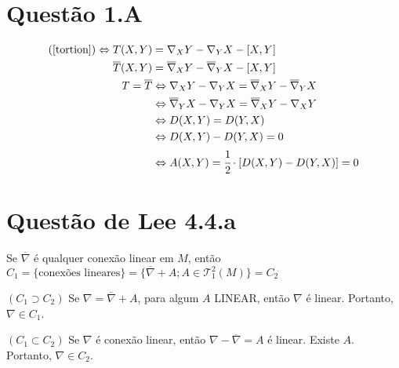\documentclass[10pt,a4paper]{article}
\begin{document}
		\vspace{12mm}

	\section{Quest\~ao 1.A}
		\begin{flushright}
		\end{flushright}

		\begin{align*}
		(\ref{tortion}) \Leftrightarrow T(X, Y) &= \nabla_X Y - \nabla_Y X - [X, Y] \\
		\overline{T}(X, Y) &= \overline{\nabla}_X Y - \overline{\nabla}_Y X - [X, Y] \\
		T = \overline{T} &\Leftrightarrow \nabla_X Y - \nabla_Y X = \overline{\nabla}_X Y - \overline{\nabla}_Y X \\
		 &\Leftrightarrow \overline{\nabla}_Y X - \nabla_Y X = \overline{\nabla}_X Y - \nabla_X Y \\
		 &\Leftrightarrow D(X, Y) = D(Y, X) \\
		 &\Leftrightarrow D(X, Y) - D(Y, X) = 0 \\
		 &\Leftrightarrow A(X, Y) = \cfrac{1}{2} \cdot [D(X, Y) - D(Y, X)] = 0 \\
		\end{align*}

		\vspace{12mm}

	\section{Quest\~ao de Lee 4.4.a}
		\begin{flushright}
		\end{flushright}

		Se $\overline{\nabla}$ \'e qualquer conex\~ao linear em $M$, ent\~ao $C_1 = \{ \text{conex\~oes lineares} \} = \{ \overline{\nabla} + A ; A \in \mathcal{T}^2_1(M)  \} = C_2$

		\vspace{12mm}

		$(C_1 \supset C_2)$ Se $\nabla = \overline{\nabla} + A$, para algum $A$ LINEAR, ent\~ao $\nabla$ \'e linear. Portanto, $\nabla \in C_1$.

		\vspace{3mm}

		$(C_1 \subset C_2)$ Se $\nabla$ \'e conex\~ao linear, ent\~ao $\nabla - \overline{\nabla} = A$ \'e linear. Existe $A$. Portanto, $\nabla \in C_2$.
\end{document}
